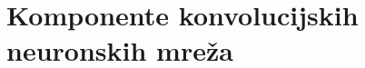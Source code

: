 
\chapter{Komponente konvolucijskih neuronskih mreža}\label{ch:komponente-konvolucijskih-neuronskih-mreza}